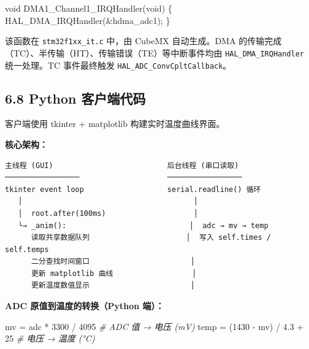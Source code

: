 \documentclass[
  chinese,
  UTF8,
  oneside,
  openany]{ctexbook}
\newenvironment{Shaded}{}{}
\newcommand{\CommentTok}[1]{\textcolor[rgb]{0.38,0.63,0.69}{\textit{#1}}}
\newcommand{\DataTypeTok}[1]{\textcolor[rgb]{0.56,0.13,0.00}{#1}}
\newcommand{\DecValTok}[1]{\textcolor[rgb]{0.25,0.63,0.44}{#1}}
\newcommand{\FloatTok}[1]{\textcolor[rgb]{0.25,0.63,0.44}{#1}}
\newcommand{\NormalTok}[1]{#1}
\newcommand{\OperatorTok}[1]{\textcolor[rgb]{0.40,0.40,0.40}{#1}}
\begin{document}
\begin{Shaded}
\begin{Highlighting}[]
\DataTypeTok{void}\NormalTok{ DMA1\_Channel1\_IRQHandler}\OperatorTok{(}\DataTypeTok{void}\OperatorTok{)}
\OperatorTok{\{}
\NormalTok{    HAL\_DMA\_IRQHandler}\OperatorTok{(\&}\NormalTok{hdma\_adc1}\OperatorTok{);}
\OperatorTok{\}}
\end{Highlighting}
\end{Shaded}

该函数在 \texttt{stm32f1xx\_it.c} 中，由 CubeMX 自动生成。DMA
的传输完成（TC）、半传输（HT）、传输错误（TE）等中断事件均由
\texttt{HAL\_DMA\_IRQHandler} 统一处理。TC 事件最终触发
\texttt{HAL\_ADC\_ConvCpltCallback}。

\subsection{6.8 Python
客户端代码}\label{python-ux5ba2ux6237ux7aefux4ee3ux7801}

客户端使用 tkinter + matplotlib 构建实时温度曲线界面。

\textbf{核心架构：}

\begin{verbatim}
主线程 (GUI)                          后台线程 (串口读取)
─────────────────                    ─────────────────
tkinter event loop                   serial.readline() 循环
   │                                       │
   │  root.after(100ms)                    │
   └→ _anim():                            │  adc → mv → temp
      读取共享数据队列                      │  写入 self.times / self.temps
      二分查找时间窗口                       │
      更新 matplotlib 曲线                  │
      更新温度数值显示                       │
\end{verbatim}

\textbf{ADC 原值到温度的转换（Python 端）：}

\begin{Shaded}
\begin{Highlighting}[]
\NormalTok{mv }\OperatorTok{=}\NormalTok{ adc }\OperatorTok{*} \DecValTok{3300} \OperatorTok{/} \DecValTok{4095}           \CommentTok{\# ADC 值 → 电压 (mV)}
\NormalTok{temp }\OperatorTok{=}\NormalTok{ (}\DecValTok{1430} \OperatorTok{{-}}\NormalTok{ mv) }\OperatorTok{/} \FloatTok{4.3} \OperatorTok{+} \DecValTok{25}    \CommentTok{\# 电压 → 温度 (°C)}
\end{Highlighting}
\end{Shaded}
\end{document}
